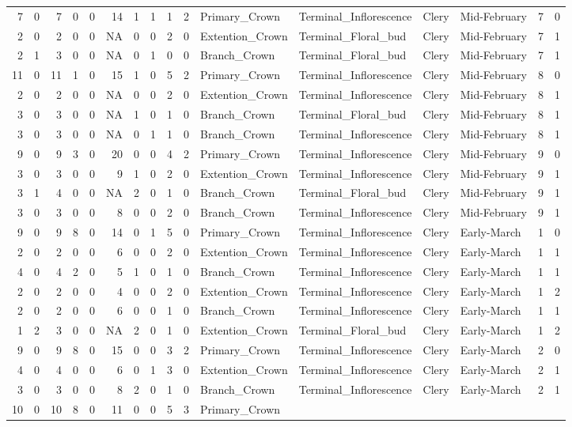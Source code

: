 \documentclass[]{article}
\begin{document}
\begin{longtable}[]{@{}rrrrrrrrrrllllrl@{}}
7 & 0 & 7 & 0 & 0 & 14 & 1 & 1 & 1 & 2 & Primary\_Crown &
Terminal\_Inflorescence & Clery & Mid-February & 7 & 0\tabularnewline
2 & 0 & 2 & 0 & 0 & NA & 0 & 0 & 2 & 0 & Extention\_Crown &
Terminal\_Floral\_bud & Clery & Mid-February & 7 & 1\tabularnewline
2 & 1 & 3 & 0 & 0 & NA & 0 & 1 & 0 & 0 & Branch\_Crown &
Terminal\_Floral\_bud & Clery & Mid-February & 7 & 1\tabularnewline
11 & 0 & 11 & 1 & 0 & 15 & 1 & 0 & 5 & 2 & Primary\_Crown &
Terminal\_Inflorescence & Clery & Mid-February & 8 & 0\tabularnewline
2 & 0 & 2 & 0 & 0 & NA & 0 & 0 & 2 & 0 & Extention\_Crown &
Terminal\_Inflorescence & Clery & Mid-February & 8 & 1\tabularnewline
3 & 0 & 3 & 0 & 0 & NA & 1 & 0 & 1 & 0 & Branch\_Crown &
Terminal\_Floral\_bud & Clery & Mid-February & 8 & 1\tabularnewline
3 & 0 & 3 & 0 & 0 & NA & 0 & 1 & 1 & 0 & Branch\_Crown &
Terminal\_Inflorescence & Clery & Mid-February & 8 & 1\tabularnewline
9 & 0 & 9 & 3 & 0 & 20 & 0 & 0 & 4 & 2 & Primary\_Crown &
Terminal\_Inflorescence & Clery & Mid-February & 9 & 0\tabularnewline
3 & 0 & 3 & 0 & 0 & 9 & 1 & 0 & 2 & 0 & Extention\_Crown &
Terminal\_Inflorescence & Clery & Mid-February & 9 & 1\tabularnewline
3 & 1 & 4 & 0 & 0 & NA & 2 & 0 & 1 & 0 & Branch\_Crown &
Terminal\_Floral\_bud & Clery & Mid-February & 9 & 1\tabularnewline
3 & 0 & 3 & 0 & 0 & 8 & 0 & 0 & 2 & 0 & Branch\_Crown &
Terminal\_Inflorescence & Clery & Mid-February & 9 & 1\tabularnewline
9 & 0 & 9 & 8 & 0 & 14 & 0 & 1 & 5 & 0 & Primary\_Crown &
Terminal\_Inflorescence & Clery & Early-March & 1 & 0\tabularnewline
2 & 0 & 2 & 0 & 0 & 6 & 0 & 0 & 2 & 0 & Extention\_Crown &
Terminal\_Inflorescence & Clery & Early-March & 1 & 1\tabularnewline
4 & 0 & 4 & 2 & 0 & 5 & 1 & 0 & 1 & 0 & Branch\_Crown &
Terminal\_Inflorescence & Clery & Early-March & 1 & 1\tabularnewline
2 & 0 & 2 & 0 & 0 & 4 & 0 & 0 & 2 & 0 & Extention\_Crown &
Terminal\_Inflorescence & Clery & Early-March & 1 & 2\tabularnewline
2 & 0 & 2 & 0 & 0 & 6 & 0 & 0 & 1 & 0 & Branch\_Crown &
Terminal\_Inflorescence & Clery & Early-March & 1 & 1\tabularnewline
1 & 2 & 3 & 0 & 0 & NA & 2 & 0 & 1 & 0 & Extention\_Crown &
Terminal\_Floral\_bud & Clery & Early-March & 1 & 2\tabularnewline
9 & 0 & 9 & 8 & 0 & 15 & 0 & 0 & 3 & 2 & Primary\_Crown &
Terminal\_Inflorescence & Clery & Early-March & 2 & 0\tabularnewline
4 & 0 & 4 & 0 & 0 & 6 & 0 & 1 & 3 & 0 & Extention\_Crown &
Terminal\_Inflorescence & Clery & Early-March & 2 & 1\tabularnewline
3 & 0 & 3 & 0 & 0 & 8 & 2 & 0 & 1 & 0 & Branch\_Crown &
Terminal\_Inflorescence & Clery & Early-March & 2 & 1\tabularnewline
10 & 0 & 10 & 8 & 0 & 11 & 0 & 0 & 5 & 3 & Primary\_Crown &

\end{longtable}
\end{document}
